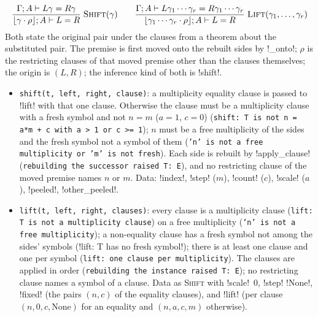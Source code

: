 \[
\frac{\Gamma;A\vdash L\gamma=R\gamma}{\lfloor\gamma\cdot\rho\rfloor;A\vdash L=R}\;\textsc{Shift}(\gamma)
\qquad
\frac{\Gamma;A\vdash L\gamma_1\cdots\gamma_r=R\gamma_1\cdots\gamma_r}{\lfloor\gamma_1\cdots\gamma_r\cdot\rho\rfloor;A\vdash L=R}\;\textsc{Lift}(\gamma_1,\ldots,\gamma_r)
\]
Both state the original pair under the clauses from a theorem about the substituted pair. The premise is first moved onto the rebuilt sides by \py!_onto!; $\rho$ is the restricting clauses of that moved premise other than the clauses themselves; the origin is $(L,R)$; the inference kind of both is \code!shift!.
\begin{itemize}
\item \texttt{shift(\allowbreak{}t,\allowbreak{} left,\allowbreak{} right,\allowbreak{} clause)}: a multiplicity equality clause is passed to \py!lift! with that one clause. Otherwise the clause must be a multiplicity clause with a fresh symbol and not $n=m$ ($a=1$, $c=0$) (\texttt{shift: T is not n = a*m + c with a > 1 or c >= 1}); $n$ must be a free multiplicity of the sides and the fresh symbol not a symbol of them (\texttt{'n' is not a free multiplicity or 'm' is not fresh}). Each side is rebuilt by \py!apply_clause! (\texttt{rebuilding the successor raised T: E}), and no restricting clause of the moved premise names $n$ or $m$. Data: \code!index!, \code!step! ($m$), \code!count! ($c$), \code!scale! ($a$), \code!peeled!, \code!other_peeled!.
\item \texttt{lift(\allowbreak{}t,\allowbreak{} left,\allowbreak{} right,\allowbreak{} clauses)}: every clause is a multiplicity clause (\texttt{lift: T is not a multiplicity clause}) on a free multiplicity (\texttt{'n' is not a free multiplicity}); a non-equality clause has a fresh symbol not among the sides' symbols (\code!lift: T has no fresh symbol!); there is at least one clause and one per symbol (\texttt{lift: one clause per multiplicity}). The clauses are applied in order (\texttt{rebuilding the instance raised T: E}); no restricting clause names a symbol of a clause. Data as \textsc{Shift} with \code!scale!~$0$, \code!step! \py!None!, \code!fixed! (the pairs $(n,c)$ of the equality clauses), and \code!lift! (per clause $(n, 0, c, \text{None})$ for an equality and $(n, a, c, m)$ otherwise).
\end{itemize}

